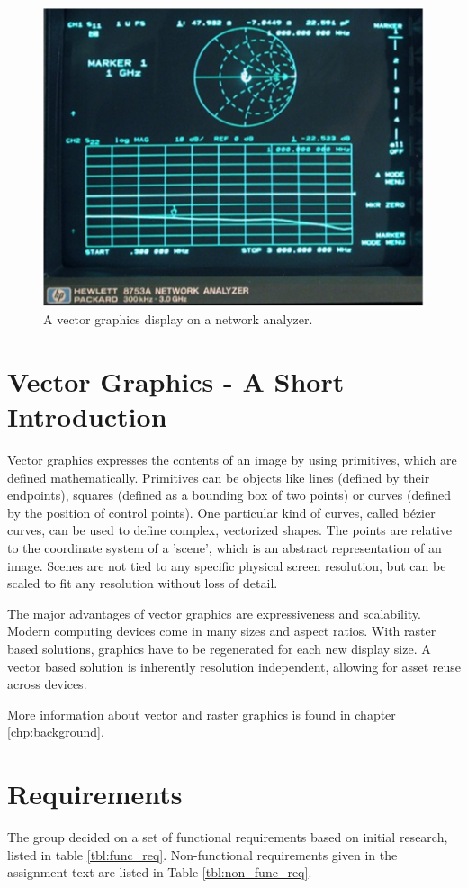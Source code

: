 \begin{figure}[h!]
    \centering
    \includegraphics[width=0.6\linewidth]{images/network-analyzer-vector-graphics-display.png}
    \caption{A vector graphics display on a network analyzer\cite{assignment-text}.}
    \label{fig:vector-display-network-analyzer}
\end{figure}

\section{Vector Graphics - A Short Introduction}
Vector graphics expresses the contents of an image by using primitives, which are defined mathematically.
Primitives can be objects like lines (defined by their endpoints), squares (defined as a bounding box of two points) or curves (defined by the position of control points).
One particular kind of curves, called bézier curves, can be used to define complex, vectorized shapes.
The points are relative to the coordinate system of a 'scene', which is an abstract representation of an image.
Scenes are not tied to any specific physical screen resolution, but can be scaled to fit any resolution without loss of detail.

The major advantages of vector graphics are expressiveness and scalability.
Modern computing devices come in many sizes and aspect ratios.
With raster based solutions, graphics have to be regenerated for each new display size.
A vector based solution is inherently resolution independent, allowing for asset reuse across devices.

More information about vector and raster graphics is found in chapter \ref{chp:background}.

\section{Requirements}
\label{sec:requirements}
The group decided on a set of functional requirements based on initial research, listed in table \ref{tbl:func_req}.
Non-functional requirements given in the assignment text are listed in Table \ref{tbl:non_func_req}.

